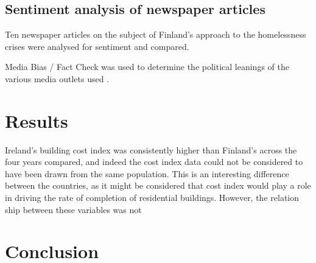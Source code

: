 \documentclass[hidelinks,12pt,oneside]{report} %
\begin{document}
\section{Sentiment analysis of newspaper articles}
Ten newspaper articles on the subject of Finland's approach to the homelessness crises were analysed for sentiment and compared. 

Media Bias / Fact Check was used to determine the political leanings of the various media outlets used \citep{bias}.

\chapter{Results}
Ireland's building cost index was consistently higher than Finland's across the four years compared, and indeed the cost index data could not be considered to have been drawn from the same population. This is an interesting difference between the countries, as it might be considered that cost index would play a role in driving the rate of completion of residential buildings. However, the relation ship between these variables was not 

\chapter{Conclusion}


\printbibliography
 
\end{document}
